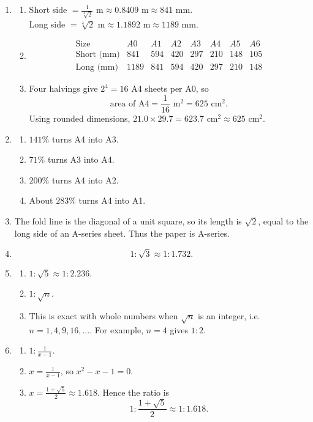 \documentclass[11pt,a4paper]{article}
\begin{document}
\begin{enumerate}[label=\textbf{Q\arabic*.}, leftmargin=*, itemsep=0.8em]
\item
\begin{enumerate}[label=(\alph*)]
\item Short side \(=\frac1{\sqrt[4]{2}}\text{ m}\approx0.8409\text{ m}\approx841\text{ mm}\). \\
Long side \(=\sqrt[4]{2}\text{ m}\approx1.1892\text{ m}\approx1189\text{ mm}\).
\item
\[
\begin{array}{c|ccccccc}
\text{Size} & A0&A1&A2&A3&A4&A5&A6\\ \hline
\text{Short (mm)} & 841&594&420&297&210&148&105\\
\text{Long (mm)} & 1189&841&594&420&297&210&148
\end{array}
\]
\item Four halvings give \(2^4=16\) A4 sheets per A0, so
\[
\text{area of A4}=\frac1{16}\text{ m}^2=625\text{ cm}^2.
\]
Using rounded dimensions, \(21.0\times29.7=623.7\text{ cm}^2\approx625\text{ cm}^2\).
\end{enumerate}

\item
\begin{enumerate}[label=(\alph*)]
\item \(141\%\) turns A4 into A3.
\item \(71\%\) turns A3 into A4.
\item \(200\%\) turns A4 into A2.
\item About \(283\%\) turns A4 into A1.
\end{enumerate}

\item
The fold line is the diagonal of a unit square, so its length is \(\sqrt2\), equal to the long side of an A-series sheet. Thus the paper is A-series.

\item
\[
1:\sqrt3\approx1:1.732.
\]

\item
\begin{enumerate}[label=(\alph*)]
\item \(1:\sqrt5\approx1:2.236\).
\item \(1:\sqrt n\).
\item This is exact with whole numbers when \(\sqrt n\) is an integer, i.e.\ \(n=1,4,9,16,\ldots\). For example, \(n=4\) gives \(1:2\).
\end{enumerate}

\item
\begin{enumerate}[label=(\alph*)]
\item \(1:\frac1{x-1}\).
\item \(x=\frac1{x-1}\), so \(x^2-x-1=0\).
\item \(x=\frac{1+\sqrt5}{2}\approx1.618\). Hence the ratio is
\[
1:\frac{1+\sqrt5}{2}\approx1:1.618.
\]
\end{enumerate}


\end{enumerate}
\end{document}
